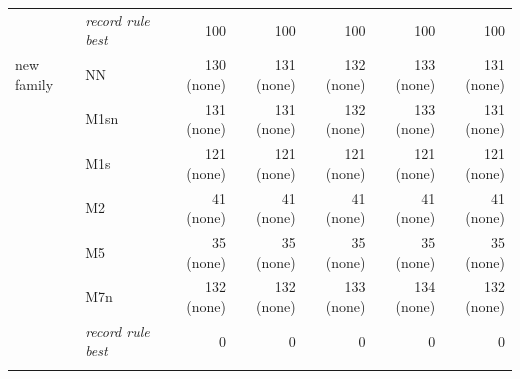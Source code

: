 \documentclass[pdflatex,sn-basic]{sn-jnl}
\begin{document}
\begin{table}[p]
\begin{tabular}{@{}llrrrrr@{}}
& \emph{record rule best} & 100 & 100 & 100 & 100 & 100 \\
new family & NN & 130 (none) & 131 (none) & 132 (none) & 133 (none) & 131 (none) \\
 & M1sn & 131 (none) & 131 (none) & 132 (none) & 133 (none) & 131 (none) \\
 & M1s & 121 (none) & 121 (none) & 121 (none) & 121 (none) & 121 (none) \\
 & M2 & 41 (none) & 41 (none) & 41 (none) & 41 (none) & 41 (none) \\
 & M5 & 35 (none) & 35 (none) & 35 (none) & 35 (none) & 35 (none) \\
 & M7n & 132 (none) & 132 (none) & 133 (none) & 134 (none) & 132 (none) \\
& \emph{record rule best} & 0 & 0 & 0 & 0 & 0 \\
\botrule
\end{tabular}
\end{table}
\end{document}
